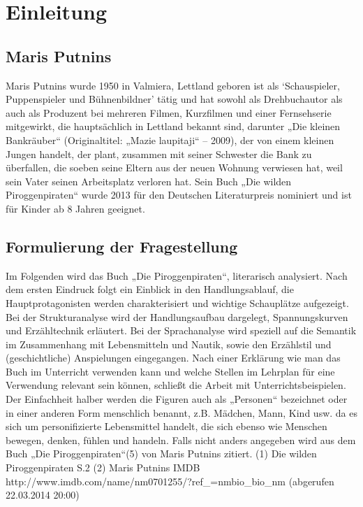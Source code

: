 \chapter{Einleitung}

\section{Maris Putnins}
Maris Putnins wurde 1950 in Valmiera, Lettland geboren ist als `Schauspieler, Puppenspieler und Bühnenbildner' tätig \cite{pir} und hat sowohl als Drehbuchautor als auch als Produzent bei mehreren Filmen, Kurzfilmen und einer Fernsehserie mitgewirkt, die hauptsächlich in Lettland bekannt  sind, \cite{imdb} darunter „Die kleinen Bankräuber“ (Originaltitel: „Mazie laupitaji“ – 2009), der von einem kleinen Jungen handelt, der plant, zusammen  mit seiner Schwester die Bank zu überfallen, die soeben seine Eltern aus der neuen Wohnung verwiesen hat, weil sein Vater seinen Arbeitsplatz verloren hat. \cite{imdb2}
Sein Buch „Die wilden Piroggenpiraten“ wurde 2013 für den Deutschen Literaturpreis nominiert und ist für Kinder ab 8 Jahren geeignet. 

\section{Formulierung der Fragestellung}
Im Folgenden wird das Buch „Die Piroggenpiraten“, literarisch analysiert. Nach dem ersten Eindruck folgt ein Einblick in den Handlungsablauf, die Hauptprotagonisten werden charakterisiert und wichtige Schauplätze aufgezeigt. Bei der Strukturanalyse wird der Handlungsaufbau dargelegt, Spannungskurven und Erzähltechnik erläutert. Bei der Sprachanalyse wird speziell auf die Semantik im Zusammenhang mit Lebensmitteln und Nautik, sowie den Erzählstil und (geschichtliche) Anspielungen eingegangen. Nach einer Erklärung wie man das Buch im Unterricht verwenden kann und welche Stellen im Lehrplan für eine Verwendung relevant sein können, schließt die Arbeit mit Unterrichtsbeispielen. Der Einfachheit halber werden die Figuren auch als „Personen“ bezeichnet oder in einer anderen Form menschlich benannt, z.B. Mädchen, Mann, Kind usw. da es sich um personifizierte Lebensmittel handelt, die sich ebenso wie Menschen bewegen, denken, fühlen und handeln. Falls nicht anders angegeben wird aus dem Buch „Die Piroggenpiraten“(5) von Maris Putnins zitiert.
(1) Die wilden Piroggenpiraten S.2 
(2) Maris Putnins IMDB 
	http://www.imdb.com/name/nm0701255/?ref_=nmbio_bio_nm
		(abgerufen 22.03.2014 20:00)

